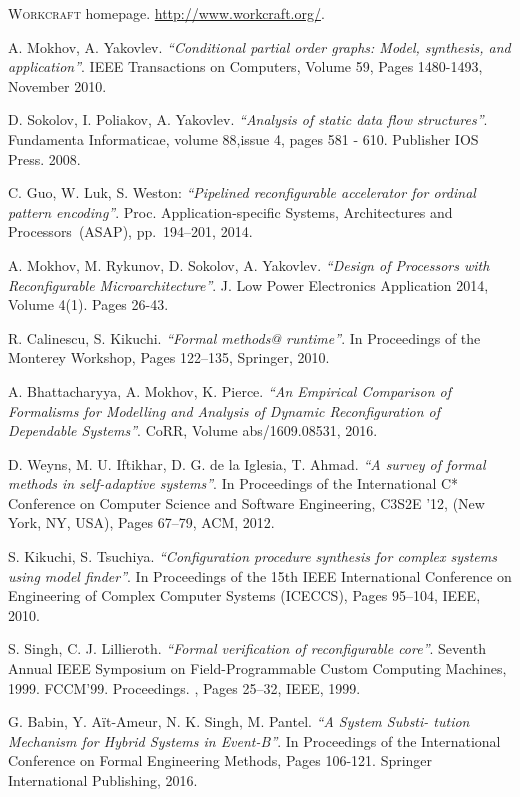 \documentclass[conference]{IEEEtran}
\begin{document}
\begin{thebibliography}{10}

    \textsc{Workcraft} homepage. \url{http://www.workcraft.org/}.

	A. Mokhov, A. Yakovlev. \emph{``Conditional partial order graphs: Model,
	synthesis, and application''}. IEEE Transactions on Computers, Volume 59,
	Pages 1480-1493, November 2010.

	D. Sokolov, I. Poliakov, A. Yakovlev. \emph{``Analysis of static data flow structures''}.
	Fundamenta Informaticae, volume 88,issue 4, pages 581 - 610. Publisher IOS Press. 2008.

	C. Guo, W. Luk, S. Weston:
	\emph{``Pipelined reconfigurable accelerator for ordinal pattern encoding''}.
	Proc. Application-specific Systems, Architectures and Processors~(ASAP),
	pp.~194--201, 2014.

	A. Mokhov, M. Rykunov, D. Sokolov, A. Yakovlev.
	\emph{``Design of Processors with Reconfigurable Microarchitecture''}.
	J. Low Power Electronics Application 2014, Volume 4(1). Pages 26-43.

R. Calinescu, S. Kikuchi. \emph{``Formal methods@ runtime''}. In Proceedings of the Monterey
Workshop, Pages 122–135, Springer, 2010.

A. Bhattacharyya, A. Mokhov, K. Pierce. \emph{``An Empirical Comparison of Formalisms for Modelling and Analysis of
	Dynamic Reconfiguration of Dependable Systems''}. CoRR, Volume abs/1609.08531, 2016.

D. Weyns, M. U. Iftikhar, D. G. de la Iglesia, T. Ahmad. \emph{``A
survey of formal methods in self-adaptive systems''}. In Proceedings of the International C* Conference on
Computer Science and Software Engineering, C3S2E ’12, (New York, NY, USA), Pages 67–79, ACM, 2012.

S. Kikuchi, S. Tsuchiya. \emph{``Configuration procedure synthesis for complex systems using model finder''}.
In Proceedings of the 15th IEEE International Conference on Engineering of Complex Computer
Systems (ICECCS), Pages 95–104, IEEE, 2010.

S. Singh, C. J. Lillieroth. \emph{``Formal verification of reconfigurable core''}.
Seventh Annual IEEE Symposium on Field-Programmable Custom Computing Machines, 1999. FCCM’99.
Proceedings. , Pages 25–32, IEEE, 1999.

G. Babin, Y. A{\"i}t-Ameur, N. K. Singh, M. Pantel. \emph{``A System Substi-
tution Mechanism for Hybrid Systems in Event-B''}.  In Proceedings of the International
Conference on Formal Engineering Methods, Pages 106-121. Springer International Publishing, 2016.

\end{thebibliography}



\end{document}
